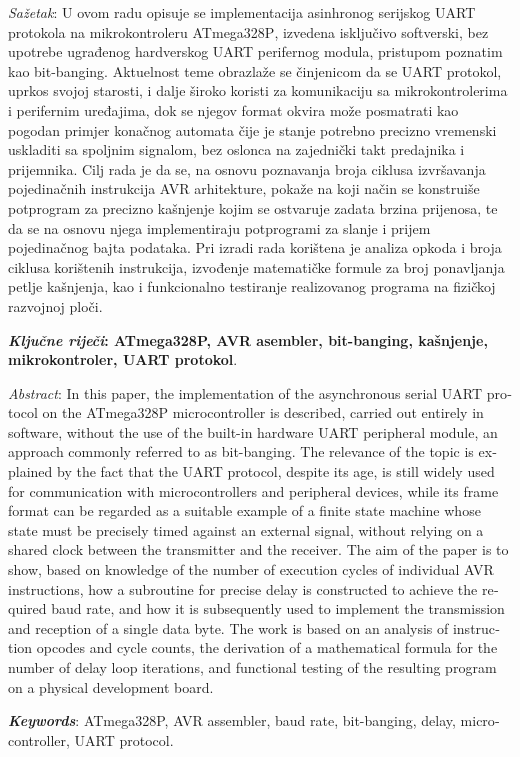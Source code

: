 %
%
\vspace*{5 em}

\normalsize\noindent\emph{Sažetak}: U ovom radu opisuje se implementacija
asinhronog serijskog \foreignlanguage{english}{UART} protokola na
mikrokontroleru \foreignlanguage{english}{ATmega328P}, izvedena
isključivo softverski, bez upotrebe ugrađenog hardverskog
\foreignlanguage{english}{UART} perifernog modula, pristupom poznatim
kao \foreignlanguage{english}{bit-banging}. Aktuelnost teme obrazlaže se
činjenicom da se \foreignlanguage{english}{UART} protokol, uprkos svojoj
starosti, i dalje široko koristi za komunikaciju sa mikrokontrolerima i
perifernim uređajima, dok se njegov format okvira može posmatrati kao
pogodan primjer konačnog automata čije je stanje potrebno precizno
vremenski uskladiti sa spoljnim signalom, bez oslonca na zajednički
takt predajnika i prijemnika. Cilj rada je da se, na osnovu poznavanja
broja ciklusa izvršavanja pojedinačnih instrukcija
\foreignlanguage{english}{AVR} arhitekture, pokaže na koji način se
konstruiše potprogram za precizno kašnjenje kojim se ostvaruje zadata
brzina prijenosa, te da se na osnovu njega implementiraju potprogrami za
slanje i prijem pojedinačnog bajta podataka. Pri izradi rada korištena
je analiza opkoda i broja ciklusa korištenih instrukcija, izvođenje
matematičke formule za broj ponavljanja petlje kašnjenja, kao i
funkcionalno testiranje realizovanog programa na fizičkoj razvojnoj
ploči.

\noindent\small{\textbf{\emph{Ključne riječi}: ATmega328P, AVR asembler, bit-banging, kašnjenje, mikrokontroler, UART protokol}}.

\vspace{5 em}

\normalsize\noindent\foreignlanguage{english}{\emph{Abstract}: In this paper, the implementation of the asynchronous serial UART protocol on the ATmega328P microcontroller is described, carried out entirely in software, without the use of the built-in hardware UART peripheral module, an approach commonly referred to as bit-banging. The relevance of the topic is explained by the fact that the UART protocol, despite its age, is still widely used for communication with microcontrollers and peripheral devices, while its frame format can be regarded as a suitable example of a finite state machine whose state must be precisely timed against an external signal, without relying on a shared clock between the transmitter and the receiver. The aim of the paper is to show, based on knowledge of the number of execution cycles of individual AVR instructions, how a subroutine for precise delay is constructed to achieve the required baud rate, and how it is subsequently used to implement the transmission and reception of a single data byte. The work is based on an analysis of instruction opcodes and cycle counts, the derivation of a mathematical formula for the number of delay loop iterations, and functional testing of the resulting program on a physical development board.}

\noindent\small{\foreignlanguage{english}{\textbf{\emph{Keywords}}: ATmega328P, AVR assembler, baud rate, bit-banging, delay, microcontroller, UART protocol}}.
\normalsize
\newpage